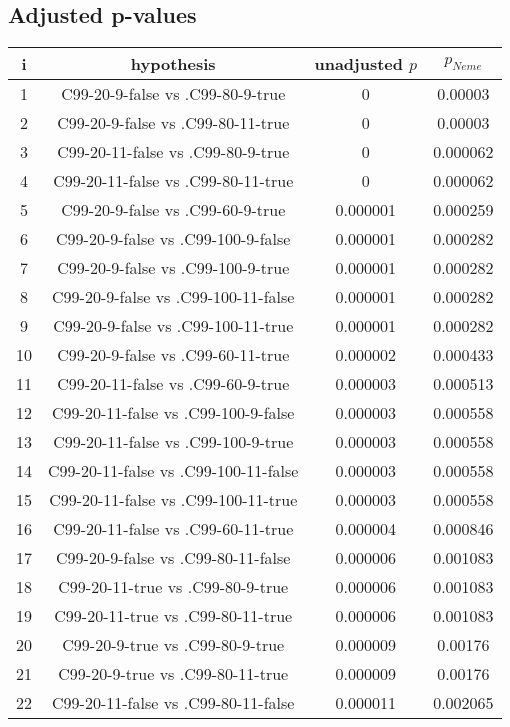 \documentclass[a4paper,10pt]{article}
\begin{document}
\begin{landscape}
\pagebreak

\subsection{Adjusted p-values}

\begin{table}[!htp]
\centering\scriptsize
\begin{tabular}{cccc}
i&hypothesis&unadjusted $p$&$p_{Neme}$\\
\hline1&C99-20-9-false vs .C99-80-9-true&0&0.00003\\
2&C99-20-9-false vs .C99-80-11-true&0&0.00003\\
3&C99-20-11-false vs .C99-80-9-true&0&0.000062\\
4&C99-20-11-false vs .C99-80-11-true&0&0.000062\\
5&C99-20-9-false vs .C99-60-9-true&0.000001&0.000259\\
6&C99-20-9-false vs .C99-100-9-false&0.000001&0.000282\\
7&C99-20-9-false vs .C99-100-9-true&0.000001&0.000282\\
8&C99-20-9-false vs .C99-100-11-false&0.000001&0.000282\\
9&C99-20-9-false vs .C99-100-11-true&0.000001&0.000282\\
10&C99-20-9-false vs .C99-60-11-true&0.000002&0.000433\\
11&C99-20-11-false vs .C99-60-9-true&0.000003&0.000513\\
12&C99-20-11-false vs .C99-100-9-false&0.000003&0.000558\\
13&C99-20-11-false vs .C99-100-9-true&0.000003&0.000558\\
14&C99-20-11-false vs .C99-100-11-false&0.000003&0.000558\\
15&C99-20-11-false vs .C99-100-11-true&0.000003&0.000558\\
16&C99-20-11-false vs .C99-60-11-true&0.000004&0.000846\\
17&C99-20-9-false vs .C99-80-11-false&0.000006&0.001083\\
18&C99-20-11-true vs .C99-80-9-true&0.000006&0.001083\\
19&C99-20-11-true vs .C99-80-11-true&0.000006&0.001083\\
20&C99-20-9-true vs .C99-80-9-true&0.000009&0.00176\\
21&C99-20-9-true vs .C99-80-11-true&0.000009&0.00176\\
22&C99-20-11-false vs .C99-80-11-false&0.000011&0.002065\\

\end{tabular}
\end{table}
\end{landscape}
\end{document}
